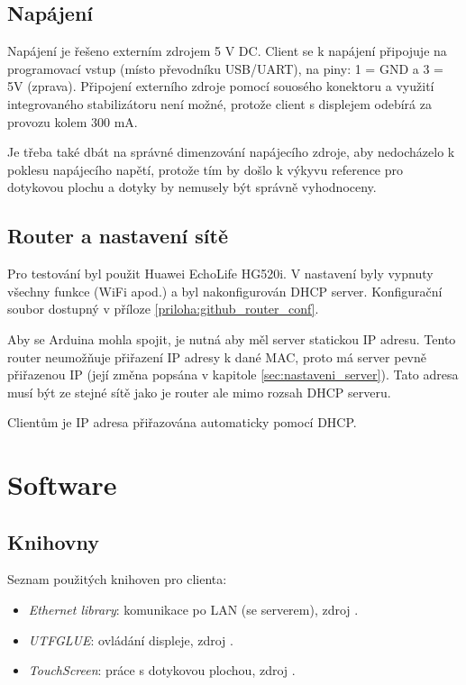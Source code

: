 \documentclass[a4paper,12pt, twoside]{article} %
\begin{document}
\subsection{Napájení}
\label{sec:napajeni}
Napájení je řešeno externím zdrojem 5 V DC. Client se k napájení připojuje na programovací vstup (místo převodníku USB/UART), na piny: 1 = GND a 3 = 5V (zprava). Připojení externího zdroje pomocí souosého konektoru a využití integrovaného stabilizátoru není možné, protože client s displejem odebírá za provozu kolem 300 mA. 

Je třeba také dbát na správné dimenzování napájecího zdroje, aby nedocházelo k poklesu napájecího napětí, protože tím by došlo k výkyvu reference pro dotykovou plochu a dotyky by nemusely být správně vyhodnoceny. 
\subsection{Router a nastavení sítě}
\label{sec:router}
Pro testování byl použit Huawei EchoLife HG520i. V nastavení byly vypnuty všechny funkce (WiFi apod.) a byl nakonfigurován DHCP server. Konfigurační soubor dostupný v příloze \ref{priloha:github_router_conf}.

Aby se Arduina mohla spojit, je nutná aby měl server statickou IP adresu. Tento router neumožňuje přiřazení IP adresy k dané MAC, proto má server pevně přiřazenou IP (její změna popsána v kapitole \ref{sec:nastaveni_server}). Tato adresa musí být ze stejné sítě jako je router ale mimo rozsah DHCP serveru.

Clientům je IP adresa přiřazována automaticky pomocí DHCP.
\clearpage
\section{Software}
\subsection{Knihovny}
\label{sec:knihovny}
Seznam použitých knihoven pro clienta:
\begin{itemize}
\item \textit{Ethernet library}: komunikace po LAN (se serverem), zdroj \cite{library_ethernet}.
\item \textit{UTFGLUE}: ovládání displeje, zdroj \cite{library_UTFGLUE}.
\item \textit{TouchScreen}: práce s dotykovou plochou, zdroj  \cite{library_touch}.
\end{itemize}
\end{document}
